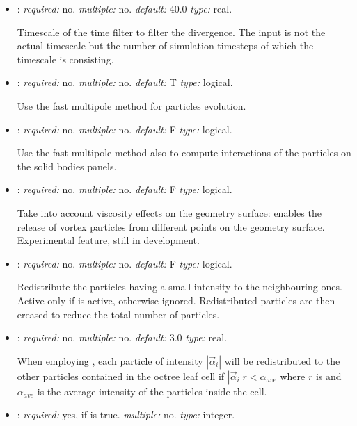 \begin{itemize}
\item {}: \textit{required:} no. \textit{multiple:} no. \textit{default:} 40.0 \textit{type:} real.

Timescale of the time filter to filter the divergence. The input is not the actual timescale but the number of simulation timesteps of which the timescale is consisting. 

\item {}: \textit{required:} no. \textit{multiple:} no. \textit{default:} T \textit{type:} logical.

Use the fast multipole method for particles evolution.

\item {}: \textit{required:} no. \textit{multiple:} no. \textit{default:} F \textit{type:} logical.

Use the fast multipole method also to compute interactions of the particles on the solid bodies panels.

\item {}: \textit{required:} no. \textit{multiple:} no. \textit{default:} F \textit{type:} logical.

Take into account viscosity effects on the geometry surface: enables the release of vortex particles from different points on the geometry surface. Experimental feature, still in development.

\item {}: \textit{required:} no. \textit{multiple:} no. \textit{default:} F \textit{type:} logical.

Redistribute the particles having a small intensity to the neighbouring ones. Active only if  is active, otherwise ignored. Redistributed particles are then ereased to reduce the total number of particles.

\item {}: \textit{required:} no. \textit{multiple:} no. \textit{default:} 3.0 \textit{type:} real.

When employing , each particle of intensity $|\vec{\alpha}_i|$ will be redistributed to the other particles contained in the octree leaf cell if $|\vec{\alpha}_i| r < \alpha_{ave}$ where $r$ is  and $\alpha_{ave}$ is the average intensity of the particles inside the cell.

\item {}: \textit{required:} yes, if  is true. \textit{multiple:} no. \textit{type:} integer.


\end{itemize}
